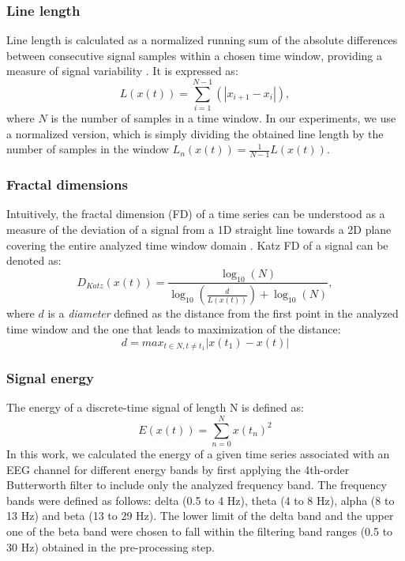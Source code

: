 \documentclass[a4paper,fleqn]{cas-sc}
\begin{document}
\subsubsection{Line length}
Line length is calculated as a normalized running sum of the absolute differences between consecutive signal samples within a chosen time window, providing a measure of signal variability \cite{esteller2001linelength}. It is expressed as:
\begin{equation}
    L(x(t))= \sum_{i=1}^{N-1}(|x_{i+1} - x_{i}|),
\end{equation}
where $N$ is the number of samples in a time window. In our experiments, we use a normalized version, which is simply dividing the obtained line length by the number of samples in the window $L_n(x(t)) = \frac{1}{N-1}L(x(t))$.

\subsubsection{Fractal dimensions}
Intuitively, the fractal dimension (FD) of a time series can be understood as a measure of the deviation of a signal from a 1D straight line towards a 2D plane covering the entire analyzed time window domain \cite{higuchi1988fd,esteller2001katzfd}.
Katz FD of a signal can be denoted as:
\begin{equation}
    D_{Katz}(x(t)) = \frac{\log_{10}(N)}{\log_{10}(\frac{d}{L(x(t))})+\log_{10}(N)},
\end{equation}
where $d$ is a \textit{diameter} defined as the distance from the first point in the analyzed time window and the one that leads to maximization of the distance:
\begin{equation}
    d = max_{t \in N, t\neq{t_1}}|x(t_1) - x(t)|
\end{equation}

\subsubsection{Signal energy}

The energy of a discrete-time signal of length N is defined as:
\begin{equation}
    E(x(t)) = \sum_{n=0}^{N}x(t_n)^{2} 
\end{equation}
In this work, we calculated the energy of a given time series associated with an EEG channel for different energy bands by first applying the 4th-order Butterworth filter to include only the analyzed frequency band. The frequency bands were defined as follows: delta (0.5 to 4 Hz), theta (4 to 8 Hz), alpha (8 to 13 Hz) and beta (13 to 29 Hz). The lower limit of the delta band and the upper one of the beta band were chosen to fall within the filtering band ranges (0.5 to 30 Hz) obtained in the pre-processing step.
\end{document}
